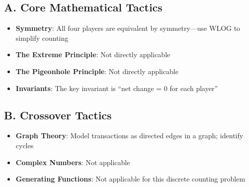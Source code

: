 \documentclass[]{article}
\begin{document}
\begin{tacticalbox}
\subsection*{A. Core Mathematical Tactics}
\begin{itemize}[leftmargin=*]
    \item \textbf{Symmetry}: All four players are equivalent by symmetry---use WLOG to simplify counting
    \item \textbf{The Extreme Principle}: Not directly applicable
    \item \textbf{The Pigeonhole Principle}: Not directly applicable
    \item \textbf{Invariants}: The key invariant is ``net change = 0 for each player''
\end{itemize}

\subsection*{B. Crossover Tactics}
\begin{itemize}[leftmargin=*]
    \item \textbf{Graph Theory}: Model transactions as directed edges in a graph; identify cycles
    \item \textbf{Complex Numbers}: Not applicable
    \item \textbf{Generating Functions}: Not applicable for this discrete counting problem
\end{itemize}
\end{tacticalbox}
\end{document}
